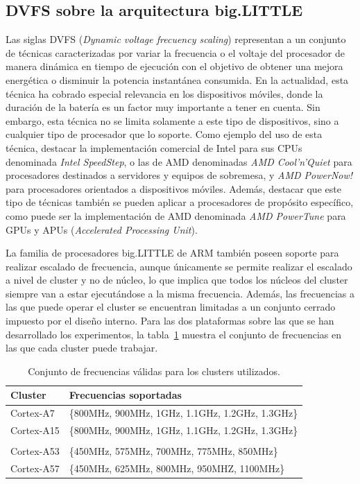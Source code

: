 \subsection{DVFS sobre la arquitectura big.LITTLE}
\label{sec:DVFS_BIGLITTLE}
Las siglas DVFS (\emph{Dynamic voltage frecuency scaling}) representan a un
conjunto de técnicas caracterizadas por variar la frecuencia o el voltaje
del procesador de manera dinámica en tiempo de ejecución con el objetivo de
obtener una mejora energética o disminuir la potencia instantánea
consumida. En la actualidad, esta técnica ha cobrado especial relevancia en
los dispositivos móviles, donde la duración de la batería es un factor muy
importante a tener en cuenta. Sin embargo, esta técnica no se limita
solamente a este tipo de dispositivos, sino a cualquier tipo de procesador
que lo soporte. Como ejemplo del uso de esta técnica, destacar la
implementación comercial de Intel para sus CPUs denominada \emph{Intel
  SpeedStep}, o las de AMD denominadas \emph{AMD Cool'n'Quiet} para
procesadores destinados a servidores y equipos de sobremesa, y \emph{AMD
  PowerNow!}  para procesadores orientados a dispositivos móviles. Además,
destacar que este tipo de técnicas también se pueden aplicar a procesadores
de propósito específico, como puede ser la implementación de AMD denominada
\emph{AMD PowerTune} para GPUs y APUs (\emph{Accelerated Processing Unit}).

La familia de procesadores big.LITTLE de ARM también poseen soporte para
realizar escalado de frecuencia, aunque únicamente se permite realizar el
escalado a nivel de cluster y no de núcleo, lo que implica que todos los
núcleos del cluster siempre van a estar ejecutándose a la misma
frecuencia. Además, las frecuencias a las que puede operar el cluster se
encuentran limitadas a un conjunto cerrado impuesto por el diseño
interno. Para las dos plataformas sobre las que se han desarrollado los
experimentos, la tabla~\ref{tab:cjto-freqs} muestra el conjunto de
frecuencias en las que cada cluster puede trabajar.

\begin{table}
  \centering
  {
    \ca{8pt}
    \begin{tabular}{ll}
      Cluster & Frecuencias soportadas \\\hline
      Cortex-A7    & \{800MHz, 900MHz, 1GHz, 1.1GHz, 1.2GHz, 1.3GHz\}\\
      Cortex-A15& \{800MHz, 900MHz, 1GHz, 1.1GHz, 1.2GHz,
                  1.3GHz\}\\\\
      Cortex-A53& \{450MHz, 575MHz, 700MHz, 775MHz,
                  850MHz\}\\
      Cortex-A57& \{450MHz, 625MHz, 800MHz, 950MHZ, 1100MHz\}\\\bottomrule
    \end{tabular}
  }
    \caption{Conjunto de frecuencias válidas para los clusters utilizados.}
    \label{tab:cjto-freqs}
\end{table}

